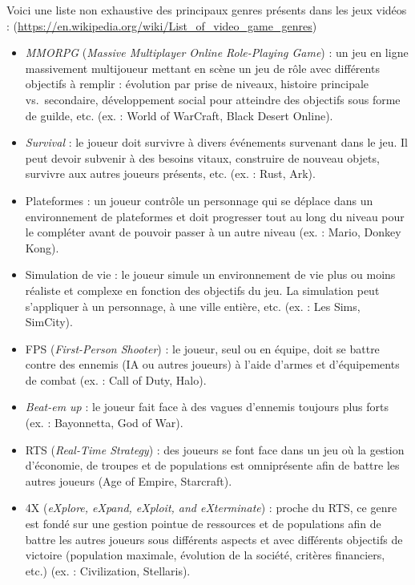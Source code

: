 

Voici une liste non exhaustive des principaux genres présents dans les jeux vidéos : (\url{https://en.wikipedia.org/wiki/List_of_video_game_genres})
\begin{itemize}
\label{MMORPG}
    \item \emph{MMORPG} (\emph{Massive Multiplayer Online Role-Playing Game}) : un jeu en ligne massivement multijoueur mettant en scène un jeu de rôle avec différents objectifs à remplir : évolution par prise de niveaux, histoire principale vs.\ secondaire, développement social pour atteindre des objectifs sous forme de guilde, etc. (ex. : World of WarCraft, Black Desert Online).
    \item \emph{Survival} : le joueur doit survivre à divers événements survenant dans le jeu. Il peut devoir subvenir à des besoins vitaux, construire de nouveau objets, survivre aux autres joueurs présents, etc. (ex. : Rust, Ark).
    \item Plateformes : un joueur contrôle un personnage qui se déplace dans un environnement de plateformes et doit progresser tout au long du niveau pour le compl\'eter avant de pouvoir passer à un autre niveau (ex. : Mario, Donkey Kong).
    \item Simulation de vie : le joueur simule un environnement de vie plus ou moins réaliste et complexe en fonction des objectifs du jeu. La simulation peut s'appliquer à un personnage, à une ville entière, etc. (ex. : Les Sims, SimCity).
    \item FPS (\emph{First-Person Shooter}) : le joueur, seul ou en équipe, doit se battre contre des ennemis (IA ou autres joueurs) à l'aide d'armes et d'équipements de combat (ex. : Call of Duty, Halo).
    \item \emph{Beat-em up} : le joueur fait face à des vagues d'ennemis toujours plus forts (ex. : Bayonnetta, God of War).
    \item RTS (\emph{Real-Time Strategy}) : des joueurs se font face dans un jeu o\`u la gestion d'économie, de troupes et de populations est omniprésente afin de battre les autres joueurs (Age of Empire, Starcraft).
    \item 4X (\emph{eXplore, eXpand, eXploit, and eXterminate}) : proche du RTS, ce genre est fondé sur une gestion pointue de ressources et de populations afin de battre les autres joueurs sous différents aspects et avec différents objectifs de victoire (population maximale, évolution de la société, critères financiers, etc.) (ex. : Civilization, Stellaris).

\end{itemize}
